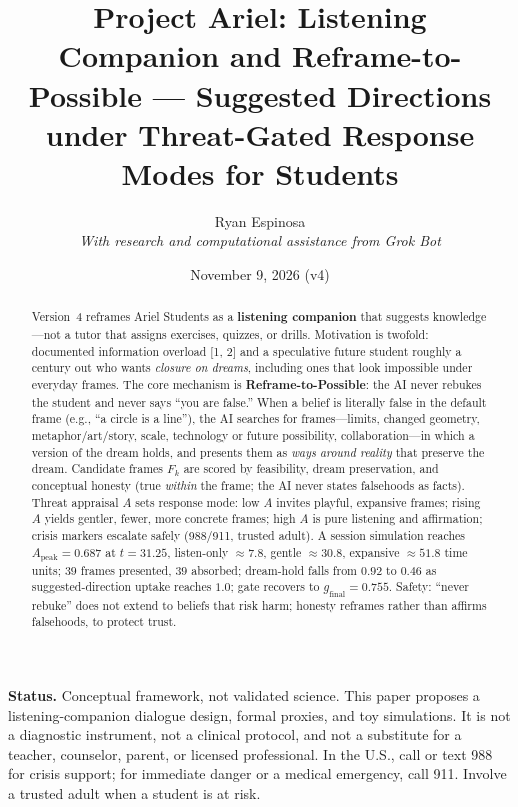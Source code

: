 \documentclass[11pt, a4paper]{article}
\title{Project Ariel: Listening Companion and Reframe-to-Possible --- Suggested Directions under Threat-Gated Response Modes for Students}
\author{Ryan Espinosa \\ \textit{With research and computational assistance from Grok Bot}}
\date{November 9, 2026 (v4)}
\begin{document}
\maketitle

\noindent\textbf{Status.} Conceptual framework, not validated science. This paper proposes a listening-companion dialogue design, formal proxies, and toy simulations. It is not a diagnostic instrument, not a clinical protocol, and not a substitute for a teacher, counselor, parent, or licensed professional. In the U.S., call or text 988 for crisis support; for immediate danger or a medical emergency, call 911. Involve a trusted adult when a student is at risk.

\begin{abstract}
Version~4 reframes Ariel Students as a \textbf{listening companion} that suggests knowledge---not a tutor that assigns exercises, quizzes, or drills. Motivation is twofold: documented information overload [1, 2] and a speculative future student roughly a century out who wants \emph{closure on dreams}, including ones that look impossible under everyday frames. The core mechanism is \textbf{Reframe-to-Possible}: the AI never rebukes the student and never says ``you are false.'' When a belief is literally false in the default frame (e.g., ``a circle is a line''), the AI searches for frames---limits, changed geometry, metaphor/art/story, scale, technology or future possibility, collaboration---in which a version of the dream holds, and presents them as \emph{ways around reality} that preserve the dream. Candidate frames $F_k$ are scored by feasibility, dream preservation, and conceptual honesty (true \emph{within} the frame; the AI never states falsehoods as facts). Threat appraisal $A$ sets response mode: low $A$ invites playful, expansive frames; rising $A$ yields gentler, fewer, more concrete frames; high $A$ is pure listening and affirmation; crisis markers escalate safely (988/911, trusted adult). A session simulation reaches $A_{\mathrm{peak}}=0.687$ at $t=31.25$, listen-only $\approx 7.8$, gentle $\approx 30.8$, expansive $\approx 51.8$ time units; $39$ frames presented, $39$ absorbed; dream-hold falls from $0.92$ to $0.46$ as suggested-direction uptake reaches $1.0$; gate recovers to $g_{\mathrm{final}}=0.755$. Safety: ``never rebuke'' does not extend to beliefs that risk harm; honesty reframes rather than affirms falsehoods, to protect trust.
\end{abstract}
\end{document}
